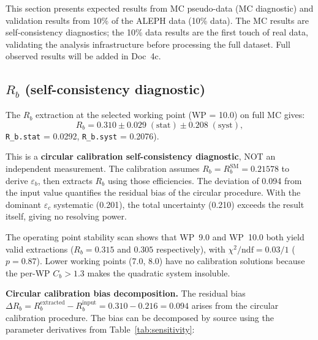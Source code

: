 \documentclass[11pt,a4paper]{article}
\begin{document}
This section presents expected results from MC pseudo-data (MC diagnostic) and
validation results from 10\% of the ALEPH data (10\% data). The MC results are
self-consistency diagnostics; the 10\% data results are the first touch of real
data, validating the analysis infrastructure before processing the full dataset.
Full observed results will be added in Doc~4c.

\subsection{$R_b$ (self-consistency diagnostic)}
\label{sec:result_rb}

The $R_b$ extraction at the selected working point (WP = 10.0) on full MC gives:
\begin{equation}
R_b = 0.310 \pm 0.029\;\mathrm{(stat)} \pm 0.208\;\mathrm{(syst)},
\label{eq:rb_result}
\end{equation}
\texttt{R\_b.stat} = 0.0292, \texttt{R\_b.syst} = 0.2076).

This is a \textbf{circular calibration self-consistency diagnostic}, NOT an independent
measurement. The calibration assumes $R_b = R_b^\mathrm{SM} = 0.21578$ to derive
$\varepsilon_b$, then extracts $R_b$ using those efficiencies. The deviation of 0.094
from the input value quantifies the residual bias of the circular procedure. With the
dominant $\varepsilon_c$ systematic (0.201), the total uncertainty (0.210)
exceeds the result itself, giving no resolving power.

The operating point stability scan shows that WP~9.0 and WP~10.0 both yield valid
extractions ($R_b = 0.315$ and $0.305$ respectively), with $\chi^2/\mathrm{ndf} = 0.03/1$
($p = 0.87$). Lower working points (7.0, 8.0) have no calibration solutions because
the per-WP $C_b > 1.3$ makes the quadratic system insoluble.

\textbf{Circular calibration bias decomposition.}
The residual bias $\Delta R_b = R_b^\mathrm{extracted} - R_b^\mathrm{input} =
0.310 - 0.216 = 0.094$ arises from the circular calibration procedure. The bias
can be decomposed by source using the parameter derivatives from
Table~\ref{tab:sensitivity}:
\end{document}
